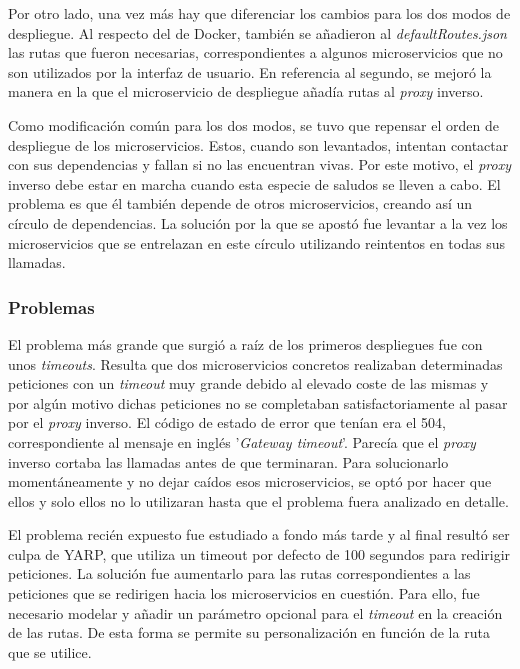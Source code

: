 \documentclass[11pt,spanish,listoffigures]{tfgetsinf}
\begin{document}
Por otro lado, una vez más hay que diferenciar los cambios para los dos modos de despliegue. Al respecto del de Docker, también se añadieron al \emph{defaultRoutes.json} las rutas que fueron necesarias, correspondientes a algunos microservicios que no son utilizados por la interfaz de usuario. En referencia al segundo, se mejoró la manera en la que el microservicio de despliegue añadía rutas al \emph{proxy} inverso.

Como modificación común para los dos modos, se tuvo que repensar el orden de despliegue de los microservicios. Estos, cuando son levantados, intentan contactar con sus dependencias y fallan si no las encuentran vivas. Por este motivo, el \emph{proxy} inverso debe estar en marcha cuando esta especie de saludos se lleven a cabo. El problema es que él también depende de otros microservicios, creando así un círculo de dependencias. La solución por la que se apostó fue levantar a la vez los microservicios que se entrelazan en este círculo utilizando reintentos en todas sus llamadas.


			\subsubsection{Problemas}

El problema más grande que surgió a raíz de los primeros despliegues fue con unos \emph{timeouts}. Resulta que dos microservicios concretos realizaban determinadas peticiones con un \emph{timeout} muy grande debido al elevado coste de las mismas y por algún motivo dichas peticiones no se completaban satisfactoriamente al pasar por el \emph{proxy} inverso. El código de estado de error que tenían era el 504, correspondiente al mensaje en inglés '\emph{Gateway timeout}'. Parecía que el \emph{proxy} inverso cortaba las llamadas antes de que terminaran. Para solucionarlo momentáneamente y no dejar caídos esos microservicios, se optó por hacer que ellos y solo ellos no lo utilizaran hasta que el problema fuera analizado en detalle.

El problema recién expuesto fue estudiado a fondo más tarde y al final resultó ser culpa de YARP, que utiliza un timeout por defecto de 100 segundos para redirigir peticiones. La solución fue aumentarlo para las rutas correspondientes a las peticiones que se redirigen hacia los microservicios en cuestión. Para ello, fue necesario modelar y añadir un parámetro opcional para el \emph{timeout} en la creación de las rutas. De esta forma se permite su personalización en función de la ruta que se utilice.
\end{document}
